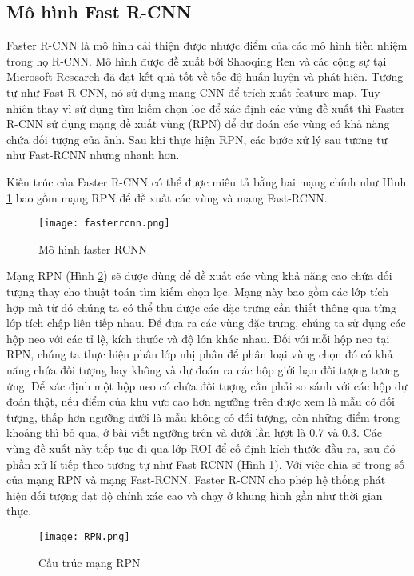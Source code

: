 \documentclass[../the.tex]{subfiles}
\begin{document}
\subsection{Mô hình Fast R-CNN}
{\fontsize{13}{12} \selectfont  

Faster R-CNN là mô hình cải thiện được nhược điểm của các mô hình tiền nhiệm trong họ R-CNN. Mô hình được đề xuất bởi
Shaoqing Ren và các cộng sự tại Microsoft Research \cite{ren2016faster} đã
đạt kết quả tốt về tốc độ huấn luyện và phát hiện. Tương tự như Fast R-CNN, nó sử dụng mạng CNN để trích xuất feature map. 
Tuy nhiên thay vì sử dụng tìm kiếm chọn lọc để xác định các vùng đề xuất thì Faster R-CNN sử dụng mạng đề xuất vùng (RPN) để dự đoán các vùng có khả năng chứa đối tượng của ảnh.
Sau khi thực hiện RPN, các bước xử lý sau tương tự như Fast-RCNN nhưng nhanh hơn.

Kiến trúc của Faster R-CNN có thể được miêu tả bằng hai mạng chính như Hình \ref{fig:fasterrcnn} bao gồm mạng RPN để đề xuất các vùng và mạng Fast-RCNN.

}
\begin{figure}[H]
	\centering
	\texttt{[image: fasterrcnn.png]}
	\caption{Mô hình faster RCNN \cite{ren2016faster}}
	\label{fig:fasterrcnn}
\end{figure}
\bigskip
{\fontsize{13}{12} \selectfont  
Mạng RPN (Hình \ref{fig:rpn}) sẽ được dùng để đề xuất các vùng khả năng cao chứa đối tượng thay cho thuật toán tìm kiếm chọn lọc. 
Mạng này bao gồm các lớp tích hợp mà từ đó chúng ta có thể thu được các đặc trưng cần thiết thông qua từng lớp tích chập liên tiếp nhau.
Để đưa ra các vùng đặc trưng, chúng ta sử dụng các hộp neo với các tỉ lệ, kích thước và độ lớn khác nhau. Đối với mỗi hộp neo tại RPN, chúng ta thực hiện phân lớp nhị phân để phân loại vùng chọn đó có khả năng chứa đối tượng hay không và dự đoán ra các hộp giới hạn đối tượng tương ứng.
Để xác định một hộp neo có chứa đối tượng cần phải so sánh với các hộp dự đoán thật, nếu điểm của khu vực cao hơn ngưỡng trên được xem là mẫu có đối tượng, thấp hơn ngưỡng dưới là mẫu không có đối tượng, còn những điểm trong khoảng thì bỏ qua, ở bài viết ngưỡng trên và dưới lần lượt là 0.7 và 0.3.
Các vùng đề xuất này tiếp tục đi qua lớp ROI để cố định kích thước đầu ra, sau đó phần xử lí tiếp theo tương tự như Fast-RCNN (Hình \ref{fig:fasterrcnn}).
Với việc chia sẽ trọng số của mạng RPN và mạng Fast-RCNN. Faster R-CNN cho phép hệ thống phát hiện đối tượng đạt độ chính xác cao và chạy ở khung hình gần như thời gian thực.
}
\begin{figure}[H]
	\centering
	\texttt{[image: RPN.png]}
	\caption{Cấu trúc mạng RPN}
	\label{fig:rpn}
\end{figure}
\bigskip
\end{document}
